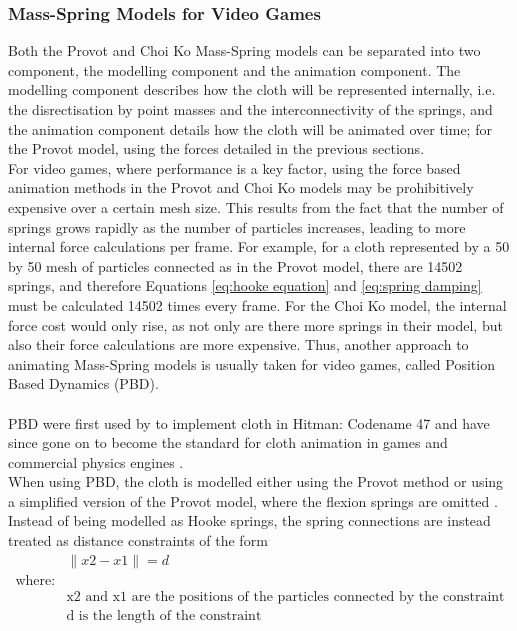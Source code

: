 \subsubsection{Mass-Spring Models for Video Games}
Both the Provot and Choi Ko Mass-Spring models can be separated into two component, the modelling component and the animation component. The modelling component describes how the cloth will be represented internally, i.e. the disrectisation by point masses and the interconnectivity of the springs, and the animation component details how the cloth will be animated over time; for the Provot model, using the forces detailed in the previous sections. 
\\For video games, where performance is a key factor, using the force based animation methods in the Provot and Choi Ko models may be prohibitively expensive over a certain mesh size. This results from the fact that the number of springs grows rapidly as the number of particles increases, leading to more internal force calculations per frame. For example, for a cloth represented by a 50 by 50 mesh of particles connected as in the Provot model, there are 14502 springs, and therefore Equations \ref{eq:hooke equation} and \ref{eq:spring damping} must be calculated 14502 times every frame. For the Choi Ko model, the internal force cost would only rise, as not only are there more springs in their model, but also their force calculations are more expensive. Thus, another approach to animating Mass-Spring models is usually taken for video games, called Position Based Dynamics (PBD).
\\\\PBD were first used by \textcite{Jakobsen2005} to implement cloth in Hitman: Codename 47 and have since gone on to become the standard for cloth animation in games \parencite[2]{Enqvist2010} and commercial physics engines \parencite{Kim2011}.
\\When using PBD, the cloth is modelled either using the Provot method \parencite[2]{Enqvist2010} or using a simplified version of the Provot model, where the flexion springs are omitted \parencites[7]{Zeller2005}[25]{Kim2011}. Instead of being modelled as Hooke springs, the spring connections are instead treated as distance constraints of the form
\begin{equation}
\begin{split}
\label{eq:distance constraint}
  &\parallel x2 - x1 \parallel = d
\\  \text{where:}
  \\&\text{x2 and x1 are the positions of the particles connected by the constraint}
  \\&\text{d is the length of the constraint}
\end{split}
\end{equation}
